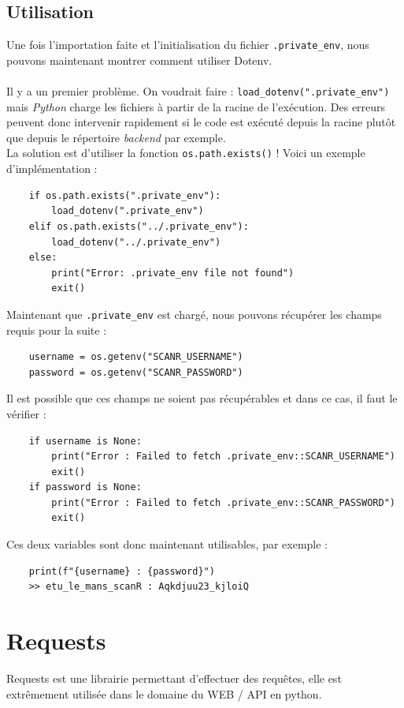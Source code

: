 \documentclass[12pt]{article}
\begin{document}
\subsection{Utilisation}
Une fois l'importation faite et l'initialisation du fichier \texttt{.private\_env}, nous pouvons maintenant montrer comment utiliser Dotenv.
\\
\\Il y a un premier problème. On voudrait faire : \texttt{load\_dotenv(".private\_env")} mais \textit{Python} charge les fichiers à partir de la racine de l'exécution.
Des erreurs peuvent donc intervenir rapidement si le code est exécuté depuis la racine plutôt que depuis le répertoire \textit{backend} par exemple.
\\La solution est d'utiliser la fonction \texttt{os.path.exists()} ! Voici un exemple d'implémentation :
\begin{verbatim}
    if os.path.exists(".private_env"):
        load_dotenv(".private_env")
    elif os.path.exists("../.private_env"):
        load_dotenv("../.private_env")
    else:
        print("Error: .private_env file not found")
        exit()
\end{verbatim}

Maintenant que \texttt{.private\_env} est chargé, nous pouvons récupérer les champs requis pour la suite :
\begin{verbatim}
    username = os.getenv("SCANR_USERNAME")
    password = os.getenv("SCANR_PASSWORD")
\end{verbatim}

Il est possible que ces champs ne soient pas récupérables et dans ce cas, il faut le vérifier :
\begin{verbatim}
    if username is None:
        print("Error : Failed to fetch .private_env::SCANR_USERNAME")
        exit()
    if password is None:
        print("Error : Failed to fetch .private_env::SCANR_PASSWORD")
        exit()
\end{verbatim}

Ces deux variables sont donc maintenant utilisables, par exemple :
\begin{verbatim}
    print(f"{username} : {password}")
    >> etu_le_mans_scanR : Aqkdjuu23_kjloiQ
\end{verbatim}

\section{Requests}
Requests est une librairie permettant d'effectuer des requêtes, elle est extrêmement utilisée dans le domaine du WEB / API en python.
\end{document}
